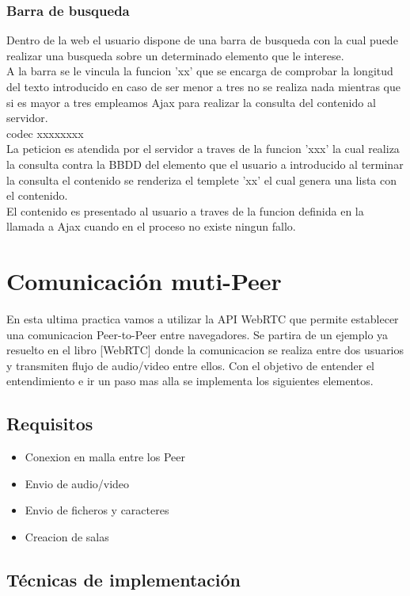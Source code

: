 \subsubsection{Barra de busqueda}
Dentro de la web el usuario dispone de una barra de busqueda con la cual puede realizar una busqueda sobre un determinado elemento que le interese.
\\A la barra se le vincula la funcion 'xx' que se encarga de comprobar la longitud del texto introducido en caso de ser menor a tres no se realiza nada mientras que si es mayor a tres empleamos Ajax para realizar la consulta del contenido al servidor.
\\codec xxxxxxxx
\\ La peticion es atendida por el servidor a traves de la funcion 'xxx' la cual realiza la consulta contra la BBDD del elemento que el usuario a introducido  al terminar la consulta el contenido se renderiza el templete 'xx' el cual genera una lista con el contenido.
\\El contenido es presentado al usuario a traves de la funcion definida en la llamada a Ajax cuando en el proceso no existe ningun fallo.
\section{Comunicación muti-Peer}
En esta ultima practica vamos a utilizar la API WebRTC que permite establecer una comunicacion Peer-to-Peer entre navegadores.
Se partira de un ejemplo ya resuelto en el libro [WebRTC] donde la comunicacion se realiza entre dos usuarios y transmiten flujo de audio/video entre ellos. Con el objetivo de entender el entendimiento e ir un paso mas alla se implementa los siguientes elementos.
\subsection{Requisitos}
\begin{itemize}
\item Conexion en malla entre los Peer
\item Envio de audio/video 
\item Envio de ficheros y  caracteres 
\item Creacion de salas 
\end{itemize}
\subsection{Técnicas de implementación}
